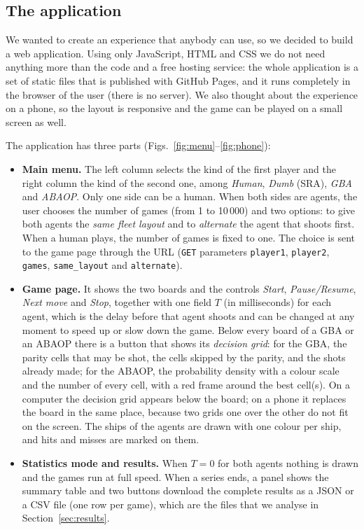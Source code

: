 \documentclass[letterpaper,11pt]{article} %
\begin{document}
\subsection{The application}

We wanted to create an experience that anybody can use, so we decided to build a web application.
Using only JavaScript, HTML and CSS we do not need anything more than the code and a free hosting service: the whole application is a set of static files that is published with GitHub Pages, and it runs completely in the browser of the user (there is no server).
We also thought about the experience on a phone, so the layout is responsive and the game can be played on a small screen as well.

The application has three parts (Figs.~\ref{fig:menu}--\ref{fig:phone}):

\begin{itemize}
    \item \textbf{Main menu.} The left column selects the kind of the first player and the right column the kind of the second one, among \emph{Human}, \emph{Dumb} (SRA), \emph{GBA} and \emph{ABAOP}. Only one side can be a human. When both sides are agents, the user chooses the number of games (from 1 to 10\,000) and two options: to give both agents the \emph{same fleet layout} and to \emph{alternate} the agent that shoots first. When a human plays, the number of games is fixed to one. The choice is sent to the game page through the URL (\texttt{GET} parameters \texttt{player1}, \texttt{player2}, \texttt{games}, \texttt{same\_layout} and \texttt{alternate}).
    \item \textbf{Game page.} It shows the two boards and the controls \emph{Start}, \emph{Pause/Resume}, \emph{Next move} and \emph{Stop}, together with one field $T$ (in milliseconds) for each agent, which is the delay before that agent shoots and can be changed at any moment to speed up or slow down the game. Below every board of a GBA or an ABAOP there is a button that shows its \emph{decision grid}: for the GBA, the parity cells that may be shot, the cells skipped by the parity, and the shots already made; for the ABAOP, the probability density with a colour scale and the number of every cell, with a red frame around the best cell(s). On a computer the decision grid appears below the board; on a phone it replaces the board in the same place, because two grids one over the other do not fit on the screen. The ships of the agents are drawn with one colour per ship, and hits and misses are marked on them.
    \item \textbf{Statistics mode and results.} When $T=0$ for both agents nothing is drawn and the games run at full speed. When a series ends, a panel shows the summary table and two buttons download the complete results as a JSON or a CSV file (one row per game), which are the files that we analyse in Section~\ref{sec:results}.
\end{itemize}
\end{document}
